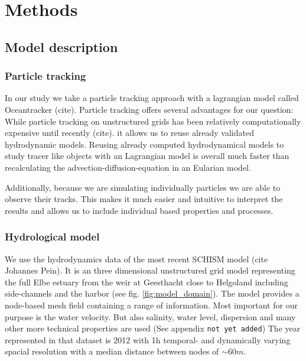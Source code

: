 \section*{Methods}

\subsection*{Model description}

\subsubsection*{Particle tracking}

In our study we take a particle tracking approach with a lagrangian model called Oceantracker (cite).
Particle tracking offers several advantages for our question:
While particle tracking on unstructured grids has been relatively computationally expensive until recently (cite).
it allows us to reuse already validated hydrodynamic models.
Reusing already computed hydrodynamical models to study tracer like objects with an Lagrangian model  is overall much faster than recalculating the advection-diffusion-equation in an Eularian model.

Additionally, because we are simulating individually particles we are able to observe their tracks.
This makes it much easier and intuitive to interpret the results and allows us to include individual based properties and processes.

\subsubsection*{Hydrological model}
We use the hydrodynamics data of the most recent SCHISM model (cite Johannes Pein).
It is an three dimensional unstructured  grid model representing the full Elbe estuary from the weir at Geesthacht close to Helgoland including side-channels and the harbor (see fig. \ref{fig:model_domain}). 
The model provides a node-based mesh field containing a range of information.
Most important for our purpose is the water velocity.
But also salinity, water level, dispersion and many other more technical properties are used (See appendix \texttt{not yet added})
The year represented in that dataset is 2012 with 1h temporal- and dynamically varying spacial resolution with a median distance between nodes of $\sim60m$.

